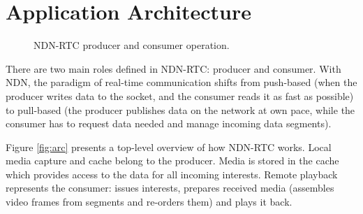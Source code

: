 \documentclass{icn/sig-alternate-2012} %
\newcommand{\ndnrtcName}{NDN-RTC} %
\begin{document}




\section{Application Architecture}
\label{sec:arch}

\begin{figure}[t!]
\centering
{}\qquad
{}
\caption{\ndnrtcName{} producer and consumer operation.}
\end{figure}



There are two main roles defined in \ndnrtcName{}: producer and consumer. With NDN, the paradigm of real-time communication shifts from push-based (when the producer writes data to the socket, and the consumer reads it as fast as possible) to pull-based (the producer publishes data on the network at own pace, while the consumer has to request data needed and manage incoming data segments).

%

Figure \ref{fig:arc} presents a top-level overview of how \ndnrtcName{} works. Local media capture and cache belong to the producer. Media is stored in the cache which provides access to the data for all incoming interests. Remote playback represents the consumer: issues interests, prepares received media (assembles video frames from segments and re-orders them) and plays it back.
\end{document}

